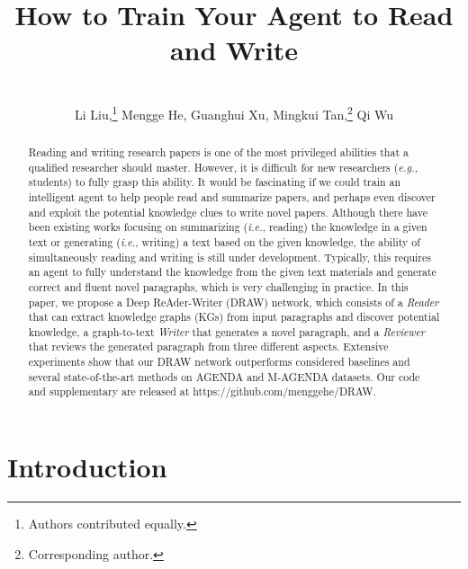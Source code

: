 \documentclass[letterpaper]{article}
\title{How to Train Your Agent to Read and Write}
\def\eg{\emph{e.g., }}
\begin{document}
\author{
\\
Li Liu,\thanks{Authors contributed equally.} Mengge He, Guanghui Xu, Mingkui Tan,\thanks{Corresponding author.} Qi Wu
\\
}
\maketitle
\begin{abstract}
Reading and writing research papers is one of the most privileged abilities that a qualified researcher should master. However, it is difficult for new researchers (\eg{students}) to fully {grasp} this ability.
It would be fascinating if we could train an intelligent agent to help people read and summarize papers, and perhaps even discover and exploit the potential knowledge clues to write novel papers. 
Although there have been existing works focusing on summarizing (\emph{i.e.}, reading) the knowledge in a given text or generating (\emph{i.e.}, writing) a text based on the given knowledge, the ability of simultaneously reading and writing is still under development. Typically, this requires an agent to fully understand the knowledge from the given text materials and generate correct and fluent novel paragraphs, which is very challenging in practice.
In this paper, we propose a Deep ReAder-Writer (DRAW) network, which consists of a \textit{Reader} that can extract knowledge graphs (KGs) from input paragraphs and discover potential knowledge,
a graph-to-text \textit{Writer} that generates a novel paragraph, and a \textit{Reviewer} that reviews the generated paragraph from three different aspects. Extensive experiments show that our DRAW network outperforms considered baselines and several state-of-the-art methods on AGENDA and M-AGENDA datasets. Our code and supplementary are released at https://github.com/menggehe/DRAW.
\end{abstract}


\section{Introduction}
\end{document}
